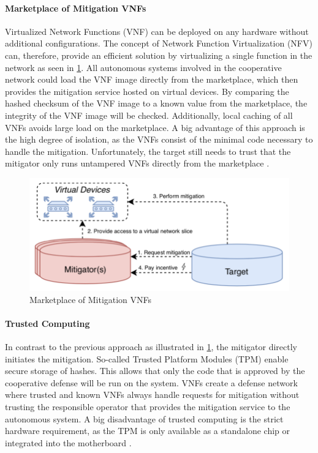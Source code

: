\paragraph{Marketplace of Mitigation VNFs}
Virtualized  Network Functions (VNF) can be deployed on any hardware without additional configurations. The concept of Network Function Virtualization (NFV) can, therefore, provide an efficient solution by virtualizing a single function in the network as seen in \ref{ddos_marketplace_vnf}. All autonomous systems involved in the cooperative network could load the VNF image directly from the marketplace, which then provides the mitigation service hosted on virtual devices. By comparing the hashed checksum of the VNF image to a known value from the marketplace, the integrity of the VNF image will be checked. Additionally, local caching of all VNFs avoids large load on the marketplace. A big advantage of this approach is the high degree of isolation, as the VNFs consist of the minimal code necessary to handle the mitigation. Unfortunately, the target still needs to trust that the mitigator only runs untampered VNFs directly from the marketplace \cite{Mannhart2018}.
\begin{figure}[ht]
  \begin{center}
    \includegraphics[scale=0.5]{Talk7/img/ddos/cooperative_network_marketplace_vnfs}
  \end{center}
  \caption{Marketplace of Mitigation VNFs}
  \label{ddos_marketplace_vnf}
\end{figure}

\paragraph{Trusted Computing}
In contrast to the previous approach as illustrated in \ref{ddos_marketplace_vnf}, the mitigator directly initiates the mitigation. So-called Trusted Platform Modules (TPM) enable secure storage of hashes. This allows that only the code that is approved by the cooperative defense will be run on the system. VNFs create a defense network where trusted and known VNFs always handle requests for mitigation without trusting the responsible operator that provides the mitigation service to the autonomous system.  A big disadvantage of trusted computing is the strict hardware requirement, as the TPM is only available as a standalone chip or integrated into the motherboard \cite{Mannhart2018}.

